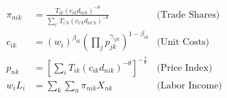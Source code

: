 \begin{align*}
    \pi_{nik} &= \frac{T_{ik} (c_{ik} d_{nik})^{-\theta}}{\sum_{i'} T_{i'k} (c_{i'k} d_{ni'k})^{-\theta}} & \text{(Trade Shares)} \\
    c_{ik} &= (w_i)^{\beta_{ik}} (\prod_{j} p_{jk}^{\gamma_{ijk}})^{1 - \beta_{ik}} & \text{(Unit Costs)} \\
    p_{nk} &= \left[ \sum_{i} T_{ik} (c_{ik} d_{nik})^{-\theta} \right]^{-\frac{1}{\theta}} & \text{(Price Index)} \\
    w_i L_i &= \sum_{k} \sum_{n} \pi_{nik} X_{nk} & \text{(Labor Income)} \\
\end{align*}